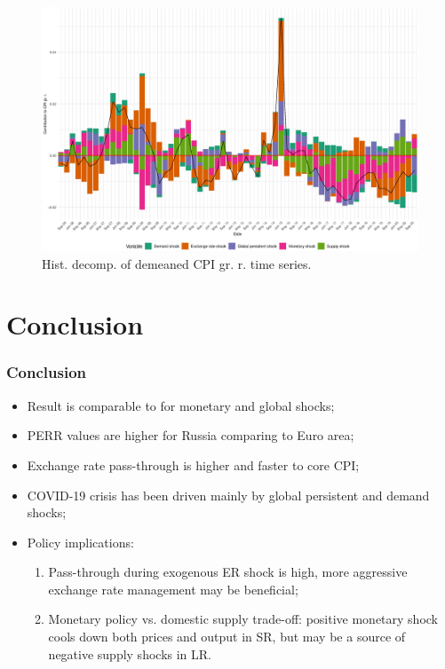\documentclass{beamer}
\begin{document}
\begin{frame}
\begin{figure}[h!]
	\centering
	\includegraphics[width=1\linewidth]{../Text/figures/hd_cpi_full}
	\caption[]{Hist. decomp. of demeaned CPI gr. r. time series.}
	\label{fig:hd_cpi_full}
\end{figure}
\end{frame}

\section{Conclusion}
\begin{frame}
\frametitle{Conclusion}
	\begin{itemize}
		\item Result is comparable to \parencite{Khotulev2020} for monetary and global shocks;
		\item PERR values are higher for Russia comparing to Euro area;
		\item Exchange rate pass-through is higher and faster to core CPI;
		\item COVID-19 crisis has been driven mainly by global persistent and demand shocks;
		\item Policy implications: 
		\begin{enumerate}
			\item Pass-through during exogenous ER shock is high, more aggressive exchange rate management may be beneficial;
			\item Monetary policy vs. domestic supply trade-off: positive monetary shock cools down both prices and output in SR, but may be a source of negative supply shocks in LR.
		\end{enumerate}
	\end{itemize}
\end{frame}
\end{document}
